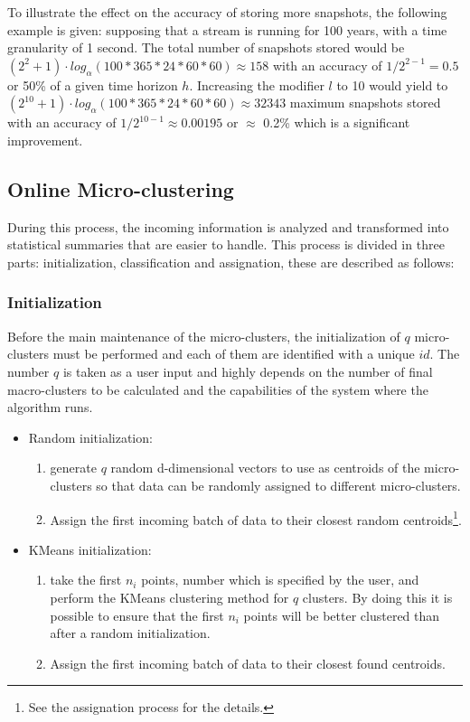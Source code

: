 To illustrate the effect on the accuracy of storing more snapshots, the following example is given: supposing that a stream is running for 100 years, with a time granularity of 1 second. The total number of snapshots stored would be $(2^2 + 1)\cdot log_{\alpha}(100*365*24*60*60) \approx 158$ with an accuracy of $1/ 2^{2-1} = 0.5$ or 50\% of a given time horizon $h$. Increasing the modifier $l$ to 10 would yield to $(2^{10} + 1)\cdot log_{\alpha}(100*365*24*60*60) \approx 32343$ maximum snapshots stored with an accuracy of $1/ 2^{10-1} \approx 0.00195$ or $\approx$ 0.2\% which is a significant improvement.


\subsection{Online Micro-clustering}

During this process, the incoming information is analyzed and transformed into statistical summaries that are easier to handle. This process is divided in three parts: initialization, classification and assignation, these are described as follows:

\subsubsection{Initialization}

Before the main maintenance of the micro-clusters, the initialization of $q$ micro-clusters must be performed and each of them are identified with a unique $id$. The number $q$ is taken as a user input and highly depends on the number of final macro-clusters to be calculated and the capabilities of the system where the algorithm runs. 

\begin{itemize}
 \item Random initialization:
 \begin{enumerate}
  \item generate $q$ random d-dimensional vectors to use as centroids of the micro-clusters so that data can be randomly assigned to different micro-clusters. 
  \item Assign the first incoming batch of data to their closest random centroids\footnote{See the assignation process for the details.}.
 \end{enumerate}

 \item KMeans initialization:
 \begin{enumerate}
  \item take the first $n_i$ points, number which is specified by the user, and perform the KMeans clustering method  for $q$ clusters. By doing this it is possible to ensure that the first $n_i$ points will be better clustered than after a random initialization. 
  \item Assign the first incoming batch of data to their closest found centroids.
 \end{enumerate}

\end{itemize}


